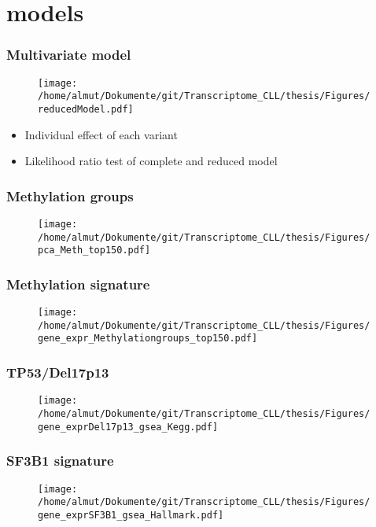 \documentclass[xcolor=dvipsnames,t,10pt]{beamer}
\begin{document}
\section{models}
%
%
\begin{frame}[c]
	\frametitle{Multivariate model}
	\begin{minipage}[t]{.67\textwidth}
		\begin{figure}
			\texttt{[image: /home/almut/Dokumente/git/Transcriptome\_CLL/thesis/Figures/reducedModel.pdf]}
		\end{figure}
	\end{minipage}
	\begin{minipage}[t]{.3\textwidth}
		\begin{itemize}
			\item Individual effect of each variant
			\item Likelihood ratio test of complete and reduced model
		\end{itemize}
	\end{minipage}
\end{frame}
% 
%
\begin{frame}[c]
	\frametitle{Methylation groups}
	\begin{figure}
		\centering
		\texttt{[image: /home/almut/Dokumente/git/Transcriptome\_CLL/thesis/Figures/pca\_Meth\_top150.pdf]}
	\end{figure}
\end{frame}
%
%
\begin{frame}[c]
	\frametitle{Methylation signature}
	\begin{figure}
		\centering
		\texttt{[image: /home/almut/Dokumente/git/Transcriptome\_CLL/thesis/Figures/gene\_expr\_Methylationgroups\_top150.pdf]}
	\end{figure}
\end{frame}
%
%
\begin{frame}[c]
	\frametitle{TP53/Del17p13}
	\begin{figure}
		\centering
		\texttt{[image: /home/almut/Dokumente/git/Transcriptome\_CLL/thesis/Figures/gene\_exprDel17p13\_gsea\_Kegg.pdf]}
	\end{figure}
\end{frame}
%
%
\begin{frame}[c]
	\frametitle{SF3B1 signature}
	\begin{figure}
		\centering
		\texttt{[image: /home/almut/Dokumente/git/Transcriptome\_CLL/thesis/Figures/gene\_exprSF3B1\_gsea\_Hallmark.pdf]}
	\end{figure}
\end{frame}
\end{document}
